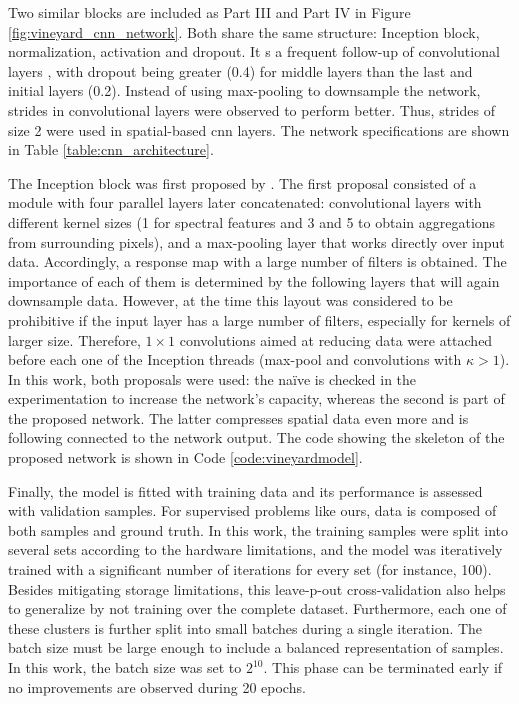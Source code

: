 Two similar blocks are included as Part III and Part IV in Figure \ref{fig:vineyard_cnn_network}. Both share the same structure: Inception block, normalization, activation and dropout. It s a frequent follow-up of convolutional layers \cite{li_faster_2022, xue_attention-based_2021}, with dropout being greater (0.4) for middle layers than the last and initial layers (0.2). Instead of using max-pooling to downsample the network, strides in convolutional layers were observed to perform better. Thus, strides of size 2 were used in spatial-based \acrshort{cnn} layers. The network specifications are shown in Table \ref{table:cnn_architecture}.

The Inception block was first proposed by \cite{szegedy_going_2014}. The first proposal consisted of a module with four parallel layers later concatenated: convolutional layers with different kernel sizes (1 for spectral features and 3 and 5 to obtain aggregations from surrounding pixels), and a max-pooling layer that works directly over input data. Accordingly, a response map with a large number of filters is obtained. The importance of each of them is determined by the following layers that will again downsample data. However, at the time this layout was considered to be prohibitive if the input layer has a large number of filters, especially for kernels of larger size. Therefore, $1\times1$ convolutions aimed at reducing data were attached before each one of the Inception threads (max-pool and convolutions with $\kappa > 1$). In this work, both proposals were used: the naïve is checked in the experimentation to increase the network's capacity, whereas the second is part of the proposed network. The latter compresses spatial data even more and is following connected to the network output. The code showing the skeleton of the proposed network is shown in Code \ref{code:vineyardmodel}.

\vspace{3mm}



Finally, the model is fitted with training data and its performance is assessed with validation samples. For supervised problems like ours, data is composed of both samples and ground truth. In this work, the training samples were split into several sets according to the hardware limitations, and the model was iteratively trained with a significant number of iterations for every set (for instance, 100). Besides mitigating storage limitations, this leave-p-out cross-validation also helps to generalize by not training over the complete dataset. Furthermore, each one of these clusters is further split into small batches during a single iteration. The batch size must be large enough to include a balanced representation of samples. In this work, the batch size was set to $2^{10}$. This phase can be terminated early if no improvements are observed during 20 epochs.

